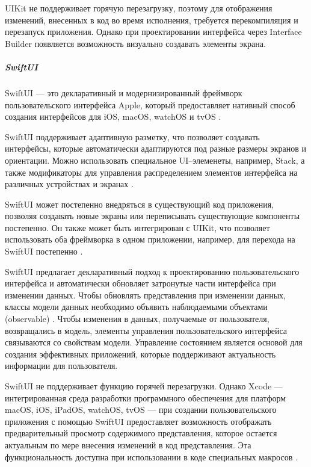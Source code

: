 UIKit не поддерживает горячую перезагрузку, поэтому для отображения изменений, внесенных в код во время исполнения, требуется перекомпиляция и перезапуск приложения.
Однако при проектировании интерфейса через Interface Builder появляется возможность визуально создавать элементы экрана.

\subparagraph{SwiftUI} 
\subparagraph{}  

SwiftUI --- это декларативный и модернизированный фреймворк пользовательского интерфейса Apple, который предоставляет нативный способ создания интерфейсов для iOS, macOS, watchOS и tvOS \cite{swiftui}.

SwiftUI поддерживает адаптивную разметку, что позволяет создавать интерфейсы, которые автоматически адаптируются под разные размеры экранов и ориентации. 
Можно использовать специальное UI--элеменеты, например, Stack, а также модификаторы для управления распределением элементов интерфейса на различных устройствах и экранах \cite{swiftui-stack}.

SwiftUI может постепенно внедряться в существующий код приложения, позволяя создавать новые экраны или переписывать существующие компоненты постепенно. 
Он также может быть интегрирован с UIKit, что позволяет использовать оба фреймворка в одном приложении, например, для перехода на SwiftUI постепенно \cite{uikit-integr}.

SwiftUI предлагает декларативный подход к проектированию пользовательского интерфейса и автоматически обновляет затронутые части интерфейса при изменении данных.
Чтобы обновлять представления при изменении данных, классы модели данных необходимо объявить наблюдаемыми объектами (observable) \cite{swiftui-observ}.
Чтобы изменения в данных, получаемые от пользователя, возвращались в модель, элементы управления пользовательского интерфейса связываются со свойствам модели.
Управление состоянием является основой для создания эффективных приложений, которые поддерживают актуальность информации для пользователя.

SwiftUI не поддерживает функцию горячей перезагрузки.
Однако Xcode --- интегрированная среда разработки программного обеспечения для платформ macOS, iOS, iPadOS, watchOS, tvOS --- при создании пользовательского приложения с помощью SwiftUI предоставляет возможность отображать предварительный просмотр содержимого представления, которое остается актуальным по мере внесения изменений в код представления. 
Эта функциональность доступна при использовании в коде специальных макросов \cite{swiftui-preview}.


